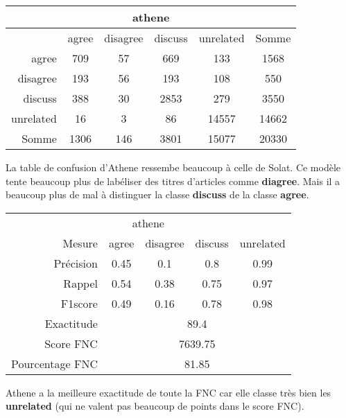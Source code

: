 

\begin{center}
 \begin{tabular}{ r | c c c c | c }
  \multicolumn{6}{c}{athene}\\
  \hline
            & agree & disagree & discuss & unrelated & Somme \\
  \hline
  agree     & 709   & 57       & 669     & 133       & 1568  \\
  disagree  & 193   & 56       & 193     & 108       & 550   \\
  discuss   & 388   & 30       & 2853    & 279       & 3550  \\
  unrelated & 16    & 3        & 86      & 14557     & 14662 \\
  \hline
  Somme     & 1306  & 146      & 3801    & 15077     & 20330 \\
 \end{tabular}
\end{center}



La table de confusion d'Athene ressembe beaucoup à celle de Solat. Ce modèle tente beaucoup plus de labéliser des titres d'articles comme \textbf{diagree}. Mais il a beaucoup plus de mal à distinguer la classe \textbf{discuss} de la classe \textbf{agree}.

\begin{center}
 \begin{tabular}{ r | c c c c }
  \multicolumn{5}{c}{athene}\\
  Mesure     & agree & disagree & discuss & unrelated \\
  \hline
  Précision & 0.45  & 0.1      & 0.8     & 0.99      \\
  Rappel     & 0.54  & 0.38     & 0.75    & 0.97      \\
  F1score    & 0.49  & 0.16     & 0.78    & 0.98      \\
  \hline
  \hline
  Exactitude & \multicolumn{4}{c}{89.4}\\
  Score FNC & \multicolumn{4}{c}{7639.75}\\
  Pourcentage FNC & \multicolumn{4}{c}{81.85}\\
 \end{tabular}
\end{center}


Athene a la meilleure exactitude de toute la FNC car elle classe très bien les \textbf{unrelated} (qui ne valent pas beaucoup de points dans le score FNC).
